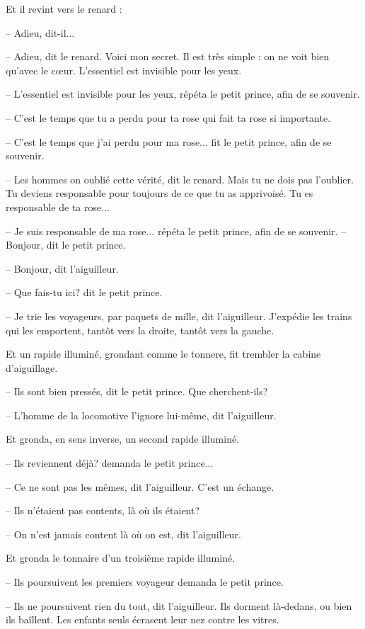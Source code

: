 \documentclass[a4paper]{report}
\begin{document}
Et il revint vers le renard :

-- Adieu, dit-il...

-- Adieu, dit le renard. Voici mon secret. Il est très simple : on ne voit bien qu'avec le cœur. L'essentiel est invisible pour les yeux.

-- L'essentiel est invisible pour les yeux, répéta le petit prince, afin de se souvenir.

-- C'est le temps que tu a perdu pour ta rose qui fait ta rose si importante.

-- C'est le temps que j'ai perdu pour ma rose... fit le petit prince, afin de se souvenir.

-- Les hommes on oublié cette vérité, dit le renard. Mais tu ne dois pas l'oublier. Tu deviens responsable pour toujours de ce que tu as apprivoisé. Tu es responsable de ta rose...

-- Je suis responsable de ma rose... répéta le petit prince, afin de se souvenir.
\parachapter{} %
-- Bonjour, dit le petit prince.

-- Bonjour, dit l'aiguilleur.

-- Que fais-tu ici? dit le petit prince.

-- Je trie les voyageurs, par paquets de mille, dit l'aiguilleur. J'expédie les trains qui les emportent, tantôt vers la droite, tantôt vers la gauche.

Et un rapide illuminé, grondant comme le tonnere, fit trembler la cabine d'aiguillage.

-- Ils sont bien pressés, dit le petit prince. Que cherchent-ils?

-- L'homme de la locomotive l'ignore lui-même, dit l'aiguilleur.

Et gronda, en sens inverse, un second rapide illuminé.

-- Ils reviennent déjà? demanda le petit prince...

-- Ce ne sont pas les mêmes, dit l'aiguilleur. C'est un échange.

-- Ils n'étaient pas contents, là où ils étaient?

-- On n'est jamais content là où on est, dit l'aiguilleur.

Et gronda le tonnaire d'un troisième rapide illuminé.

-- Ils poursuivent les premiers voyageur demanda le petit prince.

-- Ils ne poursuivent rien du tout, dit l'aiguilleur. Ils dorment là-dedans, ou bien ils ba\^illent. Les enfants seuls écrasent leur nez contre les vitres.
\end{document}
